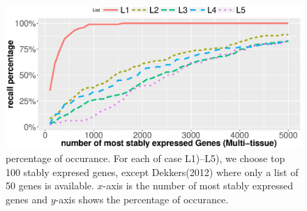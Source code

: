 \documentclass[11pt, a4paper]{article}
\begin{document}

\begin{figure}[h!]
    \begin{center}
	\includegraphics[scale=0.5]{Figures/rankVSrank_RNA2.eps}
	\caption{percentage of occurance. For each of case L1)--L5), we choose top 100 stably expresed genes, except Dekkers(2012) where only a list of 50 genes is available. $x$-axis is the number of most stably expressed genes and $y$-axis shows the percentage of occurance.}
	\label{fig:rankVSrank_RNA}
    \end{center}
\end{figure}
\end{document}
